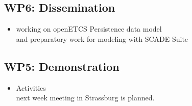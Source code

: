 \documentclass[a4paper, 11pt]{article}
\begin{document}
\subsection{WP6: Dissemination}
\begin{itemize}

\item 
working on openETCS Persistence data model\\ 
and preparatory work for modeling with  SCADE Suite
\end{itemize}

\subsection{WP5: Demonstration}

\begin{itemize}
\item Activities\\

next week meeting in Strassburg is planned.
  


\end{itemize}
\end{document}
